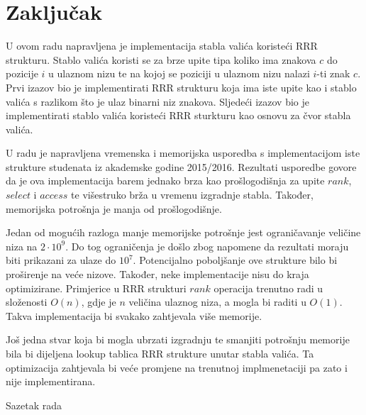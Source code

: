 \documentclass[times, utf8, seminar, numeric]{fer}
\begin{document}
\chapter{Zaključak}
\label{sec:conclusion}

U ovom radu napravljena je implementacija stabla valića koristeći RRR strukturu. Stablo valića koristi se za brze upite tipa koliko ima znakova $c$ do pozicije $i$ u ulaznom nizu te na kojoj se poziciji u ulaznom nizu nalazi $i$-ti znak $c$. Prvi izazov bio je implementirati RRR strukturu koja ima iste upite kao i stablo valića s razlikom što je ulaz binarni niz znakova. Sljedeći izazov bio je implementirati stablo valića koristeći RRR sturkturu kao osnovu za čvor stabla valića. 

U radu je napravljena vremenska i memorijska usporedba s implementacijom iste strukture studenata iz akademske godine 2015/2016. Rezultati usporedbe govore da je ova implementacija barem jednako brza kao prošlogodišnja za upite $rank$, $select$ i $access$ te višestruko brža u vremenu izgradnje stabla. Također, memorijska potrošnja je manja od prošlogodišnje.

Jedan od mogućih razloga manje memorijske potrošnje jest ograničavanje veličine niza na $2 \cdot 10^9$. Do tog ograničenja je došlo zbog napomene da rezultati moraju biti prikazani za ulaze do $10^7$. Potencijalno poboljšanje ove strukture bilo bi proširenje na veće nizove. Također, neke implementacije nisu do kraja optimizirane. Primjerice u RRR strukturi $rank$ operacija trenutno radi u složenosti $O(n)$, gdje je $n$ veličina ulaznog niza, a mogla bi raditi u $O(1)$. Takva implementacija bi svakako zahtjevala više memorije. 

Još jedna stvar koja bi mogla ubrzati izgradnju te smanjiti potrošnju memorije bila bi dijeljena lookup tablica RRR strukture unutar stabla valića. Ta optimizacija zahtjevala bi veće promjene na trenutnoj implmenetaciji pa zato i nije implementirana. 





\begin{sazetak}
Sazetak rada

\end{sazetak}
\end{document}
